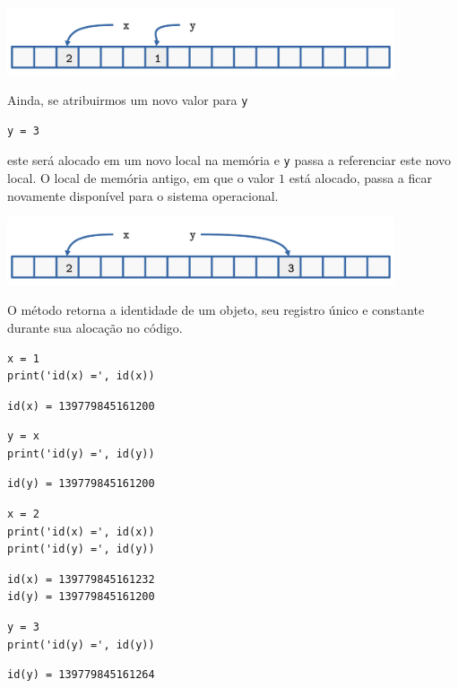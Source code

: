 \begin{center}
  \includegraphics[width=4.5in]{./cap_lingua/dados/fig_aloc_mem/xRecebe2.png}
\end{center}

Ainda, se atribuirmos um novo valor para \lstinline+y+

\begin{lstlisting}
y = 3
\end{lstlisting}

este será alocado em um novo local na memória e \lstinline+y+ passa a referenciar este novo local. O local de memória antigo, em que o valor $1$ está alocado, passa a ficar novamente disponível para o sistema operacional.

\begin{center}
  \includegraphics[width=4.5in]{./cap_lingua/dados/fig_aloc_mem/yRecebe3.png}
\end{center}

\begin{obs}
  O método {\python} {\PYTHONid} retorna a identidade de um objeto, seu registro único e constante durante sua alocação no código.

\begin{lstlisting}
x = 1
print('id(x) =', id(x))
\end{lstlisting}

\begin{verbatim}
id(x) = 139779845161200
\end{verbatim}

\begin{lstlisting}
y = x
print('id(y) =', id(y))
\end{lstlisting}

\begin{verbatim}
id(y) = 139779845161200
\end{verbatim}

\begin{lstlisting}
x = 2
print('id(x) =', id(x))
print('id(y) =', id(y))
\end{lstlisting}

\begin{verbatim}
id(x) = 139779845161232
id(y) = 139779845161200
\end{verbatim}

\begin{lstlisting}
y = 3
print('id(y) =', id(y))
\end{lstlisting}

\begin{verbatim}
id(y) = 139779845161264
\end{verbatim}


\end{obs}

